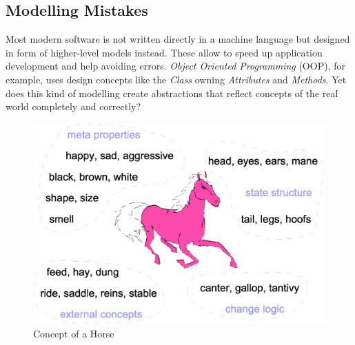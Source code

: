 %
%
%
%
%
%
%

\subsection{Modelling Mistakes}
\label{modelling_mistakes_heading}

Most modern software is not written directly in a machine language but designed
in form of higher-level models instead. These allow to speed up application
development and help avoiding errors. \emph{Object Oriented Programming} (OOP),
for example, uses design concepts like the \emph{Class} owning \emph{Attributes}
and \emph{Methods}. Yet does this kind of modelling create abstractions that
reflect concepts of the real world completely and correctly?

\begin{figure}[ht]
    \begin{center}
        \includegraphics[scale=0.2]{vector/horse.eps}
        \caption{Concept of a Horse}
        \label{horse_figure}
    \end{center}
\end{figure}

